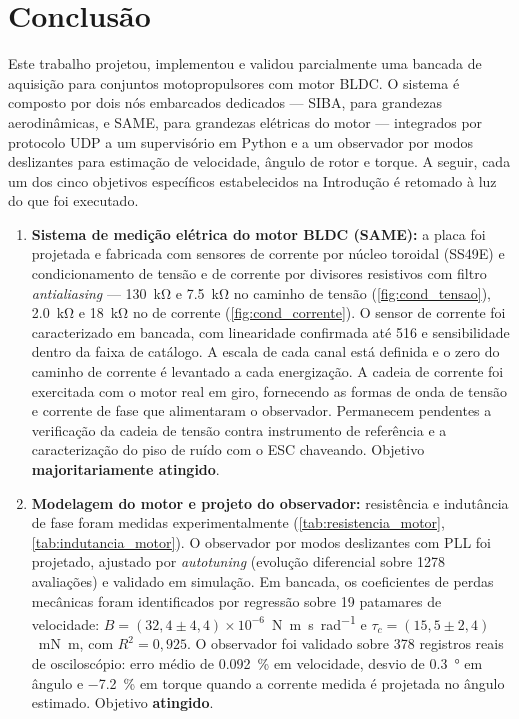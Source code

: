 \section{Conclusão}

Este trabalho projetou, implementou e validou parcialmente uma bancada de
aquisição para conjuntos motopropulsores com motor BLDC. O sistema é composto
por dois nós embarcados dedicados --- SIBA, para grandezas aerodinâmicas, e
SAME, para grandezas elétricas do motor --- integrados por protocolo UDP a um
supervisório em Python e a um observador por modos deslizantes para estimação
de velocidade, ângulo de rotor e torque. A seguir, cada um dos cinco objetivos
específicos estabelecidos na Introdução é retomado à luz do que foi executado.

\begin{enumerate}

    \item \textbf{Sistema de medição elétrica do motor BLDC (SAME):}
    a placa foi projetada e fabricada com sensores de corrente por núcleo
    toroidal (SS49E) e condicionamento de tensão e de corrente por divisores
    resistivos com filtro \textit{antialiasing} --- \SI{130}{\kilo\ohm} e
    \SI{7,5}{\kilo\ohm} no caminho de tensão (\autoref{fig:cond_tensao}),
    \SI{2,0}{\kilo\ohm} e \SI{18}{\kilo\ohm} no de corrente
    (\autoref{fig:cond_corrente}). O sensor de corrente
    foi caracterizado em bancada, com linearidade confirmada até
    \SI{516}{\gauss} e sensibilidade dentro da faixa de catálogo. A escala de
    cada canal está definida e o zero do caminho de corrente é levantado a
    cada energização. A cadeia de corrente foi exercitada com o motor real em
    giro, fornecendo as formas de onda de tensão e corrente de fase que
    alimentaram o observador. Permanecem pendentes a verificação da cadeia de
    tensão contra instrumento de referência e a caracterização do piso de
    ruído com o ESC chaveando. Objetivo \textbf{majoritariamente atingido}.

    \item \textbf{Modelagem do motor e projeto do observador:}
    resistência e indutância de fase foram medidas experimentalmente
    (\autoref{tab:resistencia_motor}, \autoref{tab:indutancia_motor}). O
    observador por modos deslizantes com PLL foi projetado, ajustado por
    \textit{autotuning} (evolução diferencial sobre \num{1278} avaliações) e
    validado em simulação. Em bancada, os coeficientes de perdas mecânicas
    foram identificados por regressão sobre \num{19} patamares de velocidade:
    $B = (32{,}4 \pm 4{,}4)\times 10^{-6}$~\si{\newton\metre\second\per\radian}
    e $\tau_c = (15{,}5 \pm 2{,}4)$~\si{\milli\newton\metre}, com
    $R^2 = 0{,}925$. O observador foi validado sobre \num{378} registros reais
    de osciloscópio: erro médio de \SI{0,092}{\percent} em velocidade, desvio
    de \SI{0,3}{\degree} em ângulo e \SI{-7,2}{\percent} em torque quando a
    corrente medida é projetada no ângulo estimado. Objetivo \textbf{atingido}.


\end{enumerate}
